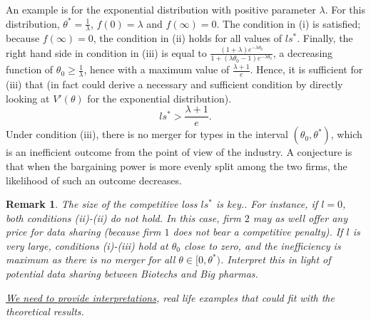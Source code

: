 \documentclass[a4paper]{article}
\newtheorem{remark}{Remark}
\renewcommand{\t}{\theta}
\begin{document}
%
An example is for the exponential distribution with positive parameter $\lambda$. For this distribution, $\t^*=\frac{1}{\lambda}$, $f(0)=\lambda$ and $f(\infty)=0$. The condition in (i) is satisfied; because $f(\infty)=0$, the condition in (ii) holds for all values of $ls^*$. Finally, the right hand side in condition in (iii) is equal to $\frac{(1+\lambda) e^{-\lambda \t_0}}{1+(\lambda \t_0-1)e^{-\lambda \t_0}}$, a decreasing function of $\t_0\geq \frac{1}{\lambda}$, hence with a maximum value of $\frac{\lambda+1}{e}$. Hence, it is sufficient for (iii) that (in fact could derive a necessary and sufficient condition by directly looking at $V'(\t)$ for the exponential distribution).
%
\[
ls^*>\frac{\lambda+1}{e}.
\]
%
%
Under condition (iii), there is no merger for types in the interval $(\t_0,\t^*)$, which is an inefficient outcome from the point of view of the industry. A conjecture is that when the bargaining power is more evenly split among the two firms, the likelihood of such an outcome decreases.

\begin{remark}
  The size of the competitive loss $ls^*$ is key.. For instance, if $l=0$, both conditions (ii)-(ii) do not hold. In this case, firm $2$ may as well offer any price for data sharing (because firm $1$ does not bear a competitive penalty). If $l$ is very large, conditions (i)-(iii) hold at $\t_0$ close to zero, and the inefficiency is maximum as there is no merger for all $\t\in[0,\t^*)$. Interpret this in light of potential data sharing between Biotechs and Big pharmas.

  \underline{We need to provide interpretations}, real life examples that could fit with the theoretical results. 
  \end{remark}
\end{document}
